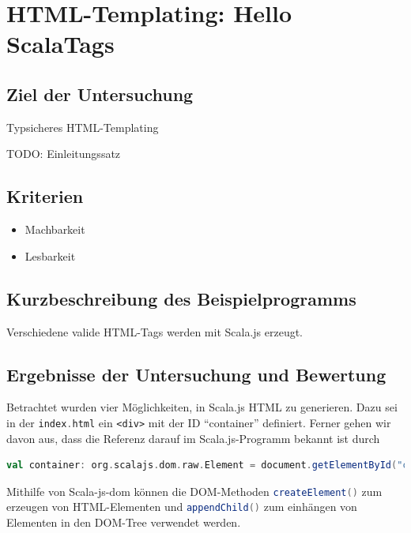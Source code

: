 \documentclass[a4paper, 12pt, hidelinks, listof=totoc, listoftables=totoc, bibliography=totoc]{scrreprt}
\newcommand{\code}[1]{\lstinline[language=Scala, style=inline]|#1|}
\newcommand{\scala}[1]{\lstinline[language=Scala, style=inline]|#1|}
\newcommand{\html}[1]{\lstinline[language=HTML5, style=inline]|#1|}
\begin{document}
\section{HTML-Templating: Hello ScalaTags}


\subsection{Ziel der Untersuchung}

Typsicheres HTML-Templating 

TODO: Einleitungssatz

\subsection{Kriterien}

\begin{itemize}
	\item Machbarkeit
	\item Lesbarkeit
\end{itemize}

\subsection{Kurzbeschreibung des Beispielprogramms}

Verschiedene valide HTML-Tags werden mit Scala.js erzeugt.

\subsection{Ergebnisse der Untersuchung und Bewertung}

Betrachtet wurden vier Möglichkeiten, in Scala.js HTML zu generieren. Dazu sei in der \code{index.html} ein
\html{<div>} mit der ID "`container"' definiert. Ferner gehen wir davon aus, dass die Referenz darauf im Scala.js-Programm bekannt ist durch

\begin{lstlisting}[language=Scala, style=snippet]
val container: org.scalajs.dom.raw.Element = document.getElementById("container")
\end{lstlisting}

Mithilfe von Scala-js-dom können die DOM-Methoden \scala{createElement()} zum erzeugen von HTML-Elementen und \scala{appendChild()} zum einhängen von Elementen in den DOM-Tree verwendet werden.
\end{document}
